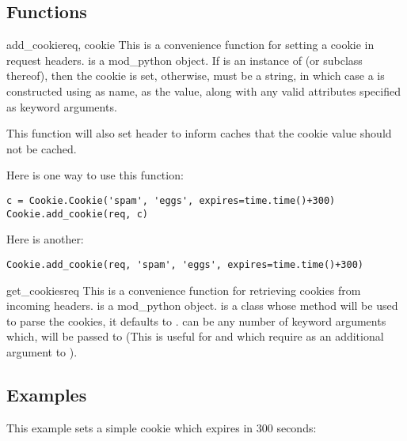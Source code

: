 \subsection{Functions\label{pyapi-cookie-func}}

\begin{funcdesc}{add_cookie}{req, cookie}
  This is a convenience function for setting a cookie in request
  headers.  is a mod_python  object.  If
   is an instance of  (or subclass thereof),
  then the cookie is set, otherwise,  must be a string, in
  which case a  is constructed using  as
  name,  as the value, along with any valid 
  attributes specified as keyword arguments.

  This function will also set  header to inform caches that the cookie value
  should not be cached.

  Here is one way to use this function:
  \begin{verbatim}
c = Cookie.Cookie('spam', 'eggs', expires=time.time()+300)
Cookie.add_cookie(req, c)
  \end{verbatim}
  Here is another:
  \begin{verbatim}
Cookie.add_cookie(req, 'spam', 'eggs', expires=time.time()+300)
  \end{verbatim}
\end{funcdesc}

\begin{funcdesc}{get_cookies}{req }
  This is a convenience function for retrieving cookies from incoming
  headers.  is a mod_python 
  object.  is a class whose  method will be
  used to parse the cookies, it defaults to . 
  can be any number of keyword arguments which, will be passed to
   (This is useful for  and
   which require  as an additional
  argument to ).
\end{funcdesc}

\subsection{Examples\label{pyapi-cookie-example}}

This example sets a simple cookie which expires in 300 seconds:

